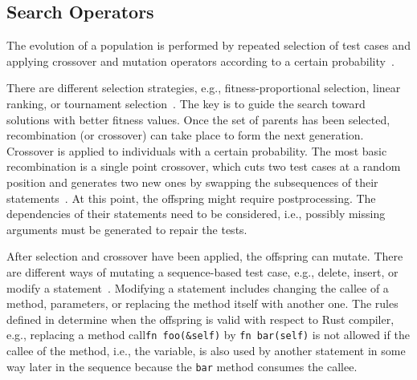 \documentclass[paper=a4,%
  twoside,%
  BCOR4mm,%
  abstract=true,%
  toc=bibliography,%
  chapterprefix=true,%
  toc=bibliographynumbered,%
  open=right,%
  english,%
  pagesize=pdftex]{scrreprt}
\begin{document}
\subsection{Search Operators}
\label{sec:search-operators}
The evolution of a population is performed by repeated selection of test cases and applying crossover and mutation operators according to a certain probability~\cite{Fraser2012}.

There are different selection strategies, e.g., fitness-proportional selection, linear ranking, or tournament selection~\cite{McMinn_2004}. The key is to guide the search toward solutions with better fitness values. Once the set of parents has been selected, recombination (or crossover) can take place to form the next generation. Crossover is applied to individuals with a certain probability. The most basic recombination is a single point crossover, which cuts two test cases at a random position and generates two new ones by swapping the subsequences of their statements~\cite{Fraser2012}. At this point, the offspring might require postprocessing. The dependencies of their statements need to be considered, i.e., possibly missing arguments must be generated to repair the tests.

After selection and crossover have been applied, the offspring can mutate. There are different ways of mutating a sequence-based test case, e.g., delete, insert, or modify a statement~\cite{Fraser2012}. Modifying a statement includes changing the callee of a method, parameters, or replacing the method itself with another one. The rules defined in  determine when the offspring is valid with respect to Rust compiler, e.g., replacing a method call\texttt{fn foo(\string&self)} by \texttt{fn bar(self)} is not allowed if the callee of the method, i.e., the variable, is also used by another statement in some way later in the sequence because the \texttt{bar} method consumes the callee.
\end{document}
